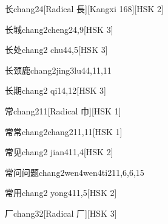 \begin{entry}{长}{chang2}{4}[Radical 長][Kangxi 168][HSK 2]
\end{entry}

\begin{entry}{长城}{chang2cheng2}{4,9}[HSK 3]
\end{entry}

\begin{entry}{长处}{chang2 chu4}{4,5}[HSK 3]
\end{entry}

\begin{entry}{长颈鹿}{chang2jing3lu4}{4,11,11}
\end{entry}

\begin{entry}{长期}{chang2 qi1}{4,12}[HSK 3]
\end{entry}

\begin{entry}{常}{chang2}{11}[Radical 巾][HSK 1]
\end{entry}

\begin{entry}{常常}{chang2chang2}{11,11}[HSK 1]
\end{entry}

\begin{entry}{常见}{chang2 jian4}{11,4}[HSK 2]
\end{entry}

\begin{entry}{常问问题}{chang2wen4wen4ti2}{11,6,6,15}
\end{entry}

\begin{entry}{常用}{chang2 yong4}{11,5}[HSK 2]
\end{entry}

\begin{entry}{厂}{chang3}{2}[Radical 厂][HSK 3]
\end{entry}

